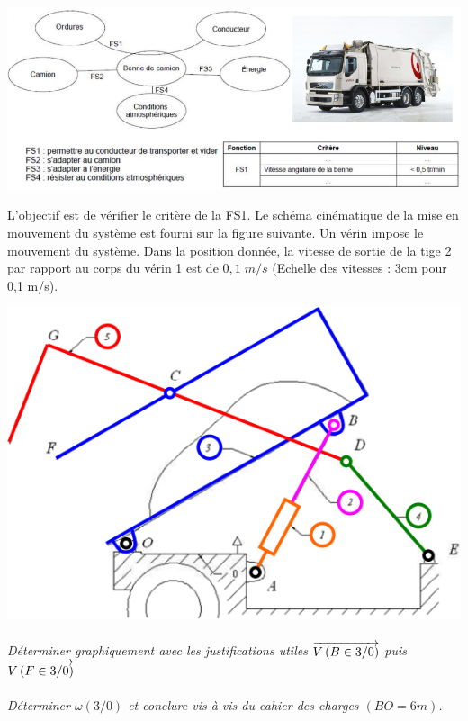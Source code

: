 \documentclass[11pt,oneside]{article}
\begin{document}
\begin{center}
\includegraphics[width=.9\textwidth]{png/fig3}
\end{center}

L'objectif est de vérifier le critère de la FS1. Le schéma cinématique de la mise en mouvement du système est fourni sur la figure suivante. Un vérin impose le mouvement du système. Dans la position donnée, la vitesse de sortie de la tige 2 par rapport au corps du vérin 1 est de $0,1\; m/s$ (Echelle des vitesses : 3cm pour 0,1 m/s).


\begin{center}
\includegraphics[width=.9\textwidth]{png/fig4}
\end{center}

\paragraph{}
\textit{Déterminer graphiquement avec les justifications utiles $\overrightarrow{V\left( {B} \in {3}/{0}\right)}$ puis $\overrightarrow{V\left( {F} \in {3}/{0}\right)}$}


\paragraph{}
\textit{Déterminer $\omega(3/0)$ et conclure vis-à-vis du cahier des charges $(BO=6m)$.}
\end{document}
